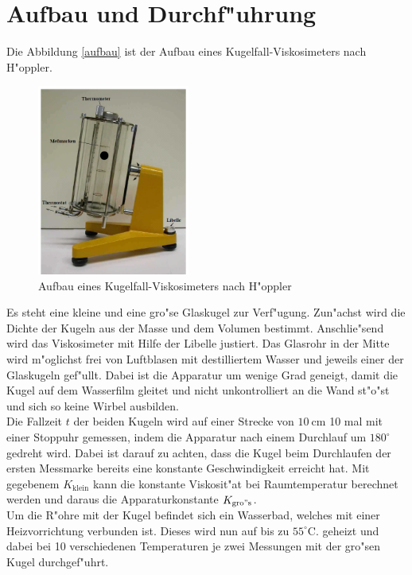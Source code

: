
\section{Aufbau und Durchf"uhrung}
	\label{sec:durchfuehrung}

	Die Abbildung \eqref{aufbau} ist der Aufbau eines Kugelfall-Viskosimeters nach H"oppler.

	\begin{figure}[htbp]
		\centering
		\includegraphics[width = 5cm]{img/aufbau.PNG}
		\caption{Aufbau eines Kugelfall-Viskosimeters nach H"oppler \cite{anleitung}}
		\label{aufbau}
	\end{figure}

	Es steht eine kleine und eine gro"se Glaskugel zur Verf"ugung.
	Zun"achst wird die Dichte der Kugeln aus der Masse und dem Volumen bestimmt.
	Anschlie"send wird das Viskosimeter mit Hilfe der Libelle justiert.
	Das Glasrohr in der Mitte wird m"oglichst frei von Luftblasen mit destilliertem Wasser und jeweils einer der Glaskugeln gef"ullt. 
	Dabei ist die Apparatur um wenige Grad geneigt, damit die Kugel auf dem Wasserfilm gleitet und nicht un\-kon\-trol\-liert an die Wand st"o"st und sich so keine Wirbel ausbilden.
	\\
	Die Fallzeit $t$ der beiden Kugeln wird auf einer Strecke von $\SI{10}{\centi\meter}$ 10 mal mit einer Stoppuhr gemessen, indem die Apparatur nach einem Durchlauf um $180^\circ$ gedreht wird.
	Dabei ist darauf zu achten, dass die Kugel beim Durchlaufen der ersten Messmarke bereits eine konstante Geschwindigkeit erreicht hat.
	Mit gegebenem $K_{\mathrm{klein}}$ kann die konstante Viskosit"at bei Raumtemperatur berechnet werden und daraus die Ap\-pa\-ra\-tur\-kon\-stan\-te $K_{\mathrm{gro"s}}$.
	\\
	Um die R"ohre mit der Kugel befindet sich ein Wasserbad, welches mit einer Heiz\-vor\-rich\-tung verbunden ist.
	Dieses wird nun auf bis zu $55^\circ$C. geheizt und dabei bei 10 verschiedenen Temperaturen je zwei Messungen mit der gro"sen Kugel durchgef"uhrt.